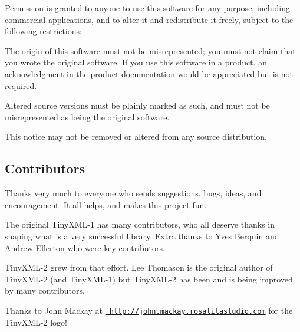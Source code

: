 Permission is granted to anyone to use this software for any purpose, including commercial applications, and to alter it and redistribute it freely, subject to the following restrictions\+:


\begin{DoxyEnumerate}
\item The origin of this software must not be misrepresented; you must not claim that you wrote the original software. If you use this software in a product, an acknowledgment in the product documentation would be appreciated but is not required.
\item Altered source versions must be plainly marked as such, and must not be misrepresented as being the original software.
\item This notice may not be removed or altered from any source distribution.
\end{DoxyEnumerate}

\subsection*{Contributors }

Thanks very much to everyone who sends suggestions, bugs, ideas, and encouragement. It all helps, and makes this project fun.

The original Tiny\+X\+M\+L-\/1 has many contributors, who all deserve thanks in shaping what is a very successful library. Extra thanks to Yves Berquin and Andrew Ellerton who were key contributors.

Tiny\+X\+M\+L-\/2 grew from that effort. Lee Thomason is the original author of Tiny\+X\+M\+L-\/2 (and Tiny\+X\+M\+L-\/1) but Tiny\+X\+M\+L-\/2 has been and is being improved by many contributors.

Thanks to John Mackay at \href{http://john.mackay.rosalilastudio.com}{\texttt{ http\+://john.\+mackay.\+rosalilastudio.\+com}} for the Tiny\+X\+M\+L-\/2 logo! 